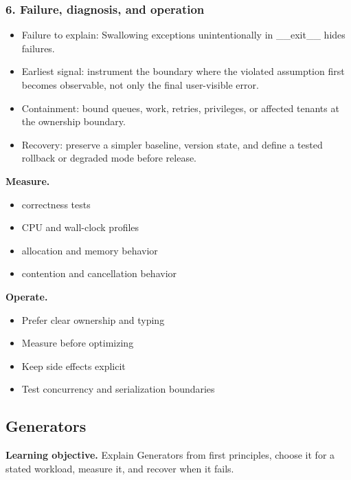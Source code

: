 \subsubsection*{6. Failure, diagnosis, and operation}
\begin{itemize}
\item Failure to explain: Swallowing exceptions unintentionally in \_\_exit\_\_ hides failures.
\item Earliest signal: instrument the boundary where the violated assumption first becomes observable, not only the final user-visible error.
\item Containment: bound queues, work, retries, privileges, or affected tenants at the ownership boundary.
\item Recovery: preserve a simpler baseline, version state, and define a tested rollback or degraded mode before release.
\end{itemize}
\textbf{Measure.}\begin{itemize}
\item correctness tests
\item CPU and wall-clock profiles
\item allocation and memory behavior
\item contention and cancellation behavior
\end{itemize}
\textbf{Operate.}\begin{itemize}
\item Prefer clear ownership and typing
\item Measure before optimizing
\item Keep side effects explicit
\item Test concurrency and serialization boundaries
\end{itemize}
\subsection{Generators}
\textbf{Learning objective.} Explain Generators from first principles, choose it for a stated workload, measure it, and recover when it fails.
